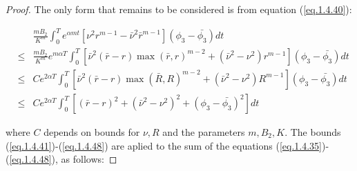 \begin{proof}
The only form that remains to be considered is from equation (\ref{eq.1.4.40}):

\begin{eqnarray}
&&\frac{mB_2}{K^m}\int_{0}^{T}e^{\alpha m t}[\nu^2r^{m-1}-\bar{\nu}^2\bar{r}^{m-1}](\phi_3-\bar{\phi_3})dt\nonumber\\ &\leq& \frac{mB_2}{K^m}e^{m\alpha T}\int_{0}^{T}[\bar{\nu}^2(\bar{r}-r)\max(\bar{r},r)^{m-2}+(\bar{\nu}^2-\nu^2)r^{m-1}](\phi_3-\bar{\phi_3})dt\nonumber\\
&\leq& Ce^{2\alpha T}\int_{0}^{T}[\bar{\nu}^2(\bar{r}-r)\max(\bar{R},R)^{m-2}+(\bar{\nu}^2-\nu^2)R^{m-1}](\phi_3-\bar{\phi_3})dt\nonumber\\
&\leq& Ce^{2\alpha T}\int_{0}^{T}[(\bar{r}-r)^2+(\bar{\nu}^2-\nu^2)^2+(\phi_3-\bar{\phi_3})^2]dt \label{eq.1.4.48}
\end{eqnarray}

where $C$ depends on bounds for $\nu,R$ and the parameters $m,B_2,K$. The bounds (\ref{eq.1.4.41})-(\ref{eq.1.4.48}) are aplied to the sum of the equations (\ref{eq.1.4.35})-(\ref{eq.1.4.48}), as follows:


\end{proof}
